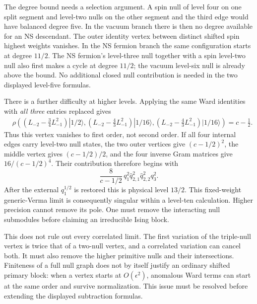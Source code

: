 The degree bound needs a selection argument.  A spin null of level
four on one split segment and level-two nulls on the other segment
and the third edge would have balanced degree five.  In the vacuum
branch there is then no degree available for an NS descendant.  The
outer identity vertex between distinct shifted spin highest weights
vanishes.  In the NS fermion branch the same configuration starts at
degree $11/2$.  The NS fermion's level-three null together with a spin
level-two null also first makes a cycle at degree $11/2$; the vacuum
level-six null is already above the bound.  No additional closed null
contribution is needed in the two displayed level-five formulas.

There is a further difficulty at higher levels.  Applying the same
Ward identities with \emph{all three} entries replaced gives
\begin{align}
 &\rho\left(
 (L_{-2}-\tfrac34L_{-1}^2)|1/2\rangle,
 (L_{-2}-\tfrac43L_{-1}^2)|1/16\rangle,
 (L_{-2}-\tfrac43L_{-1}^2)|1/16\rangle
 \right)=c-\frac12.
 \label{eq:ising-triple-null}
\end{align}
Thus this vertex vanishes to first order, not second order.  If all
four internal edges carry level-two null states, the two outer
vertices give $(c-1/2)^2$, the middle vertex gives $(c-1/2)/2$, and
the four inverse Gram matrices give $16/(c-1/2)^4$.  Their contribution
therefore begins with
\begin{equation}
 \frac{8}{c-1/2}\,
 q_1^2\hat q_{2,1}^{2}\hat q_{2,2}^{2}q_3^2.
\end{equation}
After the external $q_1^{1/2}$ is restored this is physical level
$13/2$.  This fixed-weight generic-Verma limit is consequently singular
within a level-ten calculation.  Higher precision cannot remove its pole.
One must remove the interacting null submodules before claiming an
irreducible Ising block.

This does not rule out every correlated limit.  The first variation
of the triple-null vertex is twice that of a two-null vertex, and a
correlated variation can cancel both.  It must also remove the higher
primitive nulls and their intersections.  Finiteness of a full null
graph does not by itself justify an ordinary shifted primary block:
when a vertex starts at $O(\epsilon^2)$, anomalous Ward terms can
start at the same order and survive normalization.  This issue must
be resolved before extending the displayed subtraction formulas.

